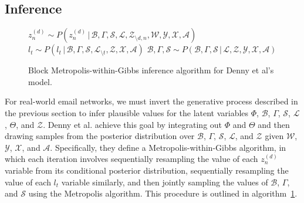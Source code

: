 \documentclass{pnastwo}
\newcommand{\g}{\,|\,}
\begin{document}
\begin{article}


\subsection{Inference}

\begin{figure}[t]
  \caption{Block Metropolis-within-Gibbs inference algorithm for Denny
    et al's model.}
  \label{alg:inference_algorithm}
  \begin{algorithmic}[1]
    \State $z^{(d)}_n \sim P(z_n^{(d)} \g
    \mathcal{B},
    \Gamma, \mathcal{S}, \mathcal{L},
    \mathcal{Z}_{\setminus d, n},
    \mathcal{W}, \mathcal{Y}, \mathcal{X},
    \mathcal{A})$
    \EndFor
    \EndFor
    \State $l_t \sim
    P(l_t \g \mathcal{B},
    \Gamma,
    \mathcal{S},
    \mathcal{L}_{\setminus
      t}, \mathcal{Z},
    \mathcal{X},
    \mathcal{A})$
    \EndFor
    \State $\mathcal{B},
    \Gamma,
    \mathcal{S}
    \sim
    P(\mathcal{B},
    \Gamma,
    \mathcal{S}
    \g
    \mathcal{L},
    \mathcal{Z},
    \mathcal{Y},
    \mathcal{X},
    \mathcal{A})$
    \EndFor
  \end{algorithmic}
\end{figure}

For real-world email networks, we must invert the generative process
described in the previous section to infer plausible values for the
latent variables $\Phi$, $\mathcal{B}$, $\Gamma$, $\mathcal{S}$,
$\mathcal{L}$, $\Theta$, and $\mathcal{Z}$. Denny et al. achieve this
goal by integrating out $\Phi$ and $\Theta$ and then drawing samples
from the posterior distribution over $\mathcal{B}$, $\Gamma$,
$\mathcal{S}$, $\mathcal{L}$, and $\mathcal{Z}$ given $\mathcal{W}$,
$\mathcal{Y}$, $\mathcal{X}$, and $\mathcal{A}$. Specifically, they
define a Metropolis-within-Gibbs algorithm, in which each iteration
involves sequentially resampling the value of each $z_n^{(d)}$
variable from its conditional posterior distribution, sequentially
resampling the value of each $l_t$ variable similarly, and then
jointly sampling the values of $\mathcal{B}$, $\Gamma$, and
$\mathcal{S}$ using the Metropolis algorithm. This procedure is
outlined in algorithm~\ref{alg:inference_algorithm}.


\end{article}
\end{document}
